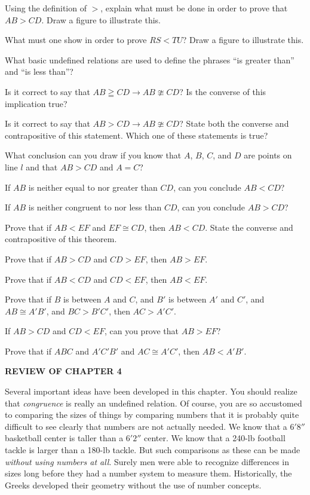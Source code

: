 \documentclass[11pt]{book}
\theoremstyle{bkplain}
\newcommand{\IVhead}[1]{%
  \par\bigskip\begin{center}\bfseries\large\MakeUppercase{#1}\end{center}%
  \par\nopagebreak\medskip}
\theoremstyle{XIplainnote}
\theoremstyle{bkplain}
\theoremstyle{bkplain}
\begin{document}
\begin{exercisecols}
\begin{exlist}
\item Using the definition of $>$, explain what must be done in order to prove
      that $AB > CD$. Draw a figure to illustrate this.
\item What must one show in order to prove $RS < TU$? Draw a figure to
      illustrate this.
\item What basic undefined relations are used to define the phrases ``is greater
      than'' and ``is less than''?
\item Is it correct to say that $AB \geqq CD \rightarrow AB \ncong CD$? Is the
      converse of this implication true?
\item Is it correct to say that $AB > CD \rightarrow AB \ncong CD$? State both
      the converse and contrapositive of this statement. Which one of these
      statements is true?
\item What conclusion can you draw if you know that $A$, $B$, $C$, and $D$ are
      points on line $l$ and that $AB > CD$ and $A = C$?
\item If $AB$ is neither equal to nor greater than $CD$, can you conclude
      $AB < CD$?
\item If $AB$ is neither congruent to nor less than $CD$, can you conclude
      $AB > CD$?
\item[\stex 9.] Prove that if $AB < EF$ and $EF \cong CD$, then $AB < CD$.
      State the converse and contrapositive of this theorem.
\item[\stex 10.] Prove that if $AB > CD$ and $CD > EF$, then $AB > EF$.
\item[\stex 11.] Prove that if $AB < CD$ and $CD < EF$, then $AB < EF$.
\item[\stex 12.] Prove that if $B$ is between $A$ and $C$, and $B'$ is between
      $A'$ and $C'$, and $AB \cong A'B'$, and $BC > B'C'$, then $AC > A'C'$.
\item[13.] If $AB > CD$ and $CD < EF$, can you prove that $AB > EF$?
\item[\stex 14.] Prove that if $ABC$ and $A'C'B'$ and $AC \cong A'C'$, then
      $AB < A'B'$.
\end{exlist}

\IVhead{Review of Chapter 4}

Several important ideas have been developed in this chapter. You should realize
that \emph{congruence} is really an undefined relation. Of course, you are so
accustomed to comparing the sizes of things by comparing numbers that it is
probably quite difficult to see clearly that numbers are not actually needed. We
know that a $6'8''$ basketball center is taller than a
$6'2''$ center. We know that a 240-lb football tackle is
larger than a 180-lb tackle. But such comparisons as these can be made
\emph{without using numbers at all}. Surely men were able to recognize
differences in sizes long before they had a number system to measure them.
Historically, the Greeks developed their geometry without the use of number
concepts.


\end{exercisecols}
\end{document}
